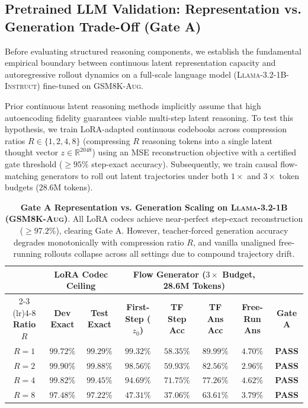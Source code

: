 \subsection{Pretrained LLM Validation: Representation vs. Generation Trade-Off (Gate A)}
\label{sec:gate_a}

Before evaluating structured reasoning components, we establish the fundamental empirical boundary between continuous latent representation capacity and autoregressive rollout dynamics on a full-scale language model (\textsc{Llama-3.2-1B-Instruct}) fine-tuned on \textsc{GSM8K-Aug}.

Prior continuous latent reasoning methods \citep{hao2024coconut,yu2024colar} implicitly assume that high autoencoding fidelity guarantees viable multi-step latent reasoning. To test this hypothesis, we train LoRA-adapted continuous codebooks across compression ratios $R \in \{1, 2, 4, 8\}$ (compressing $R$ reasoning tokens into a single latent thought vector $z \in \mathbb{R}^{2048}$) using an MSE reconstruction objective with a certified gate threshold ($\ge 95\%$ step-exact accuracy). Subsequently, we train causal flow-matching generators to roll out latent trajectories under both $1\times$ and $3\times$ token budgets ($28.6$M tokens).

\begin{table}[t]
\centering
\small
\caption{\textbf{Gate A Representation vs. Generation Scaling on \textsc{Llama-3.2-1B} (\textsc{GSM8K-Aug})}. All LoRA codecs achieve near-perfect step-exact reconstruction ($\ge 97.2\%$), clearing Gate A. However, teacher-forced generation accuracy degrades monotonically with compression ratio $R$, and vanilla unaligned free-running rollouts collapse across all settings due to compound trajectory drift.}
\label{tab:gate_a_metrics}
\vspace{2mm}
\begin{tabular}{c ccc cccc}
\toprule
& \multicolumn{2}{c}{\textbf{LoRA Codec Ceiling}} & \multicolumn{4}{c}{\textbf{Flow Generator ($3\times$ Budget, 28.6M Tokens)}} \\
\cmidrule(lr){2-3} \cmidrule(lr){4-8}
\textbf{Ratio} $R$ & \textbf{Dev Exact} & \textbf{Test Exact} & \textbf{First-Step ($z_0$)} & \textbf{TF Step Acc} & \textbf{TF Ans Acc} & \textbf{Free-Run Ans} & \textbf{Gate A} \\
\midrule
$R = 1$ & $99.72\%$ & $99.29\%$ & $99.32\%$ & $58.35\%$ & $89.99\%$ & $4.70\%$ & \textbf{PASS} \\
$R = 2$ & $99.90\%$ & $99.88\%$ & $98.56\%$ & $59.93\%$ & $82.56\%$ & $2.96\%$ & \textbf{PASS} \\
$R = 4$ & $99.82\%$ & $99.45\%$ & $94.69\%$ & $71.75\%$ & $77.26\%$ & $4.62\%$ & \textbf{PASS} \\
$R = 8$ & $97.48\%$ & $97.22\%$ & $47.31\%$ & $37.06\%$ & $63.61\%$ & $3.79\%$ & \textbf{PASS} \\
\bottomrule
\end{tabular}
\end{table}

